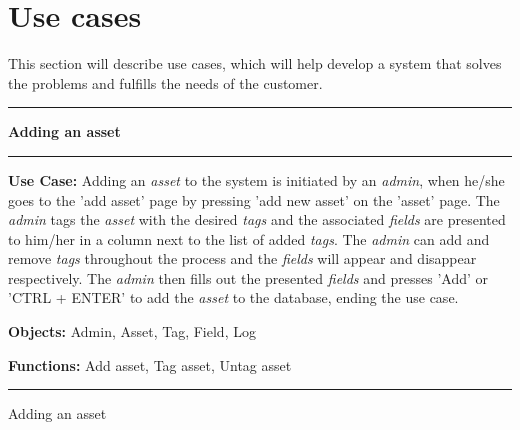 \section{Use cases}\label{sc:usecases}
This section will describe use cases, which will help develop a system that solves the problems and fulfills the needs of the customer.

\begin{use_case}[H]
    \hrule
    \vskip 0.3cm
    \Large
    \begin{center}
    
        \textbf{Adding an asset}
        
    \end{center}
    \vskip 0.1cm
    \hrule
    \vskip 0.2cm
    \normalsize
    
    \textbf{Use Case:} Adding an \textit{asset} to the system is initiated by an \textit{admin}, when he/she goes to the 'add asset' page by pressing 'add new asset' on the 'asset' page. The \textit{admin} tags the \textit{asset} with the desired \textit{tags} and the associated \textit{fields} are presented to him/her in a column next to the list of added \textit{tags}. The \textit{admin} can add and remove \textit{tags} throughout the process and the \textit{fields} will appear and disappear respectively. The \textit{admin} then fills out the presented \textit{fields} and presses 'Add' or 'CTRL + ENTER' to add the \textit{asset} to the database, ending the use case.
    
    \vskip 0.2cm
    
    \textbf{Objects:} Admin, Asset, Tag, Field, Log
    
    \vskip 0.2cm
    
    \textbf{Functions:} Add asset, Tag asset, Untag asset
    
    \vskip 0.4cm
    \hrule
    \vskip 0.2cm
    \caption{Adding an asset} \label{use_case:adding_an_asset}
\end{use_case}


